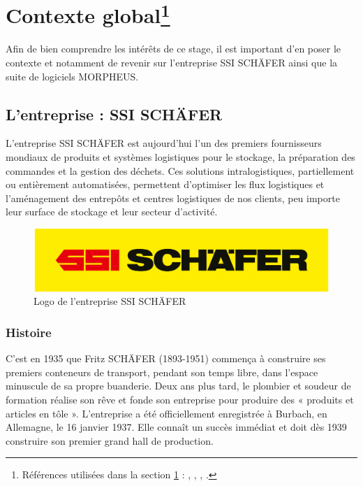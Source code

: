 \documentclass[a4paper, 12pt, french]{article}
\begin{document}
	\newpage

	
	



	\section{Contexte global\footnote{Références utilisées dans la section \ref{section:context} : \cite{schaefer}, \cite{history}, \cite{schaeferFR}, \cite{schaeferMorpheus}.}}\label{section:context}
	Afin de bien comprendre les intérêts de ce stage, il est important d'en poser le contexte et notamment de revenir sur l'entreprise SSI SCHÄFER ainsi que la suite de logiciels MORPHEUS.
	
		\subsection{L'entreprise : SSI SCHÄFER}
	L'entreprise SSI SCHÄFER est aujourd'hui l'un des premiers fournisseurs mondiaux de produits et systèmes logistiques pour le stockage, la préparation des commandes et la gestion des déchets. Ces solutions intralogistiques, partiellement ou entièrement automatisées, permettent d’optimiser les flux logistiques et l’aménagement des entrepôts et centres logistiques de nos clients, peu importe leur surface de stockage et leur secteur d’activité.

			\begin{figure}[h!]
				\begin{center}
					\includegraphics[width=0.7\linewidth]{images/schaefer.jpg}
				\end{center}
				\caption{Logo de l'entreprise SSI SCHÄFER}
				\label{fig:schaefer}
			\end{figure}	
		
			\subsubsection{Histoire}
	C'est en 1935 que Fritz SCHÄFER (1893-1951) commença à construire ses premiers conteneurs de transport, pendant son temps libre, dans l'espace minuscule de sa propre buanderie. Deux ans plus tard, le plombier et soudeur de formation réalise son rêve et fonde son entreprise pour produire des « produits et articles en tôle ». L'entreprise a été officiellement enregistrée à Burbach, en Allemagne, le 16 janvier 1937. Elle connaît un succès immédiat et doit dès 1939 construire son premier grand hall de production.\\
\end{document}
